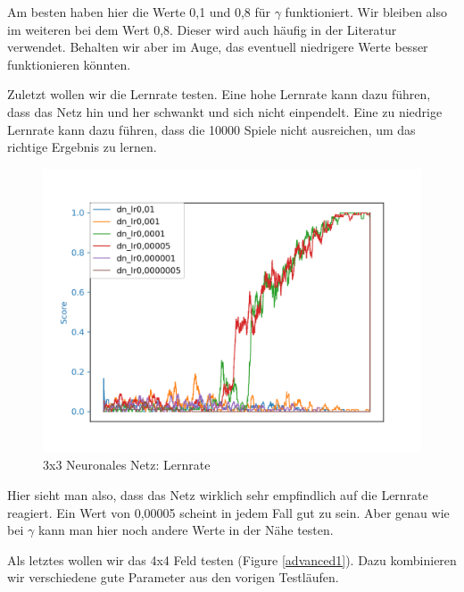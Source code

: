 Am besten haben hier die Werte 0,1 und 0,8 für $\gamma$ funktioniert. Wir bleiben also im weiteren bei dem Wert 0,8. Dieser wird auch häufig in der Literatur verwendet. Behalten wir aber im Auge, das eventuell niedrigere Werte besser funktionieren könnten.

Zuletzt wollen wir die Lernrate testen. Eine hohe Lernrate kann dazu führen, dass das Netz hin und her schwankt und sich nicht einpendelt. Eine zu niedrige Lernrate kann dazu führen, dass die 10000 Spiele nicht ausreichen, um das richtige Ergebnis zu lernen.

\begin{figure}[H]
\centering
\includegraphics[width=\textwidth]{Figures/3x3_dn_lr0,01_dn_lr0,001_dn_lr0,0001_dn_lr0,00005_dn_lr0,000001_dn_lr0,0000005.png}
\caption{3x3 Neuronales Netz: Lernrate}
\label{dn4}
\end{figure}

Hier sieht man also, dass das Netz wirklich sehr empfindlich auf die Lernrate reagiert. Ein Wert von 0,00005 scheint in jedem Fall gut zu sein. Aber genau wie bei $\gamma$ kann man hier noch andere Werte in der Nähe testen.

Als letztes wollen wir das 4x4 Feld testen (Figure \ref{advanced1}). Dazu kombinieren wir verschiedene gute Parameter aus den vorigen Testläufen.


